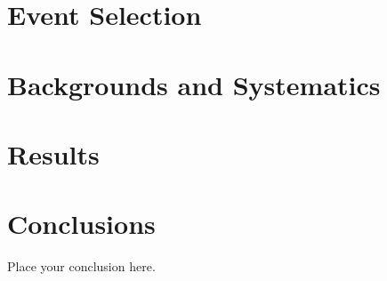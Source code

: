 \documentclass{brandeis-dissertation}
\begin{document}
\chapter{Event Selection}
\label{sec:EventSelection}

\clearpage
\chapter{Backgrounds and Systematics}
\label{sec:BackgroundsSys}

\clearpage
\chapter{Results}
\label{sec:Results}

\clearpage

\clearpage
\chapter{Conclusions}
\label{sec:conclusion}

Place your conclusion here.
\clearpage



\clearpage
\end{document}
